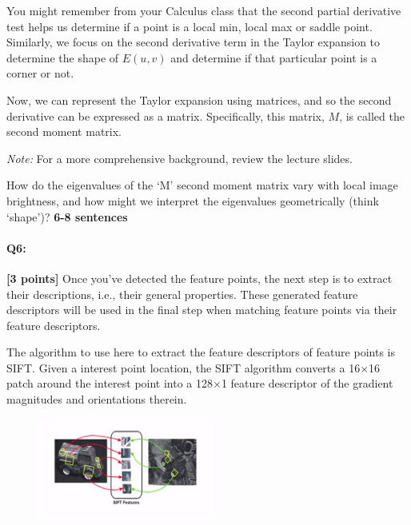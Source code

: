 \documentclass[11pt]{article}
\begin{document}
You might remember from your Calculus class that the second partial derivative test helps us determine if a point is a local min, local max or saddle point. Similarly, we focus on the second derivative term in the Taylor expansion to determine the shape of $E(u, v)$ and determine if that particular point is a corner or not.

Now, we can represent the Taylor expansion using matrices, and so the second derivative can be expressed as a matrix. Specifically, this matrix, $M$, is called the second moment matrix.

\textit{Note:} For a more comprehensive background, review the lecture slides.

\begin{tcolorbox}[colback=orange!5!white,colframe=orange!75!black]
How do the eigenvalues of the `M' second moment matrix vary with local image brightness, and how might we interpret the eigenvalues geometrically (think `shape')? \textbf{6-8 sentences}
\end{tcolorbox}


\pagebreak
\paragraph{Q6:} \textbf{[3 points]}
Once you've detected the feature points, the next step is to extract their descriptions, i.e., their general properties. These generated feature descriptors will be used in the final step when matching feature points via their feature descriptors.

The algorithm to use here to extract the feature descriptors of feature points is SIFT. Given a interest point location, the SIFT algorithm converts a 16$\times$16 patch around the interest point into a 128$\times$1 feature descriptor of the gradient magnitudes and orientations therein.

\begin{center}
\includegraphics[width=300px,height=125px]{images/sift.png} 
\end{center}
\end{document}
